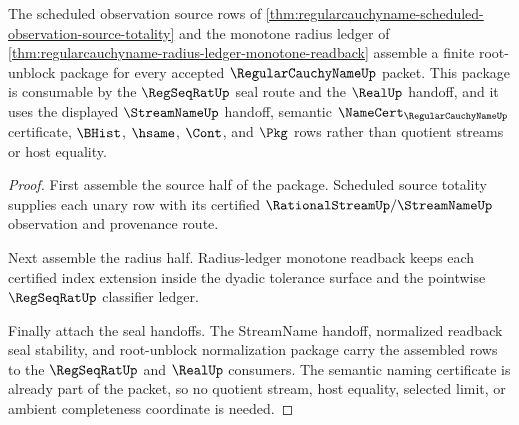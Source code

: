 \begin{theorem}
\label{thm:regularcauchyname-regseqrat-real-seal-root-unblock}
The scheduled observation source rows of \autoref{thm:regularcauchyname-scheduled-observation-source-totality} and the monotone radius ledger of \autoref{thm:regularcauchyname-radius-ledger-monotone-readback} assemble a finite root-unblock package for every accepted $\RegularCauchyNameUp$ packet. This package is consumable by the $\RegSeqRatUp$ seal route and the $\RealUp$ handoff, and it uses the displayed $\StreamNameUp$ handoff, semantic $\NameCert_{\RegularCauchyNameUp}$ certificate, $\BHist$, $\hsame$, $\Cont$, and $\Pkg$ rows rather than quotient streams or host equality.
\end{theorem}
\begin{proof}
First assemble the source half of the package. Scheduled source totality supplies each unary row with its certified $\RationalStreamUp/\StreamNameUp$ observation and provenance route.

Next assemble the radius half. Radius-ledger monotone readback keeps each certified index extension inside the dyadic tolerance surface and the pointwise $\RegSeqRatUp$ classifier ledger.

Finally attach the seal handoffs. The StreamName handoff, normalized readback seal stability, and root-unblock normalization package carry the assembled rows to the $\RegSeqRatUp$ and $\RealUp$ consumers. The semantic naming certificate is already part of the packet, so no quotient stream, host equality, selected limit, or ambient completeness coordinate is needed.
\end{proof}


